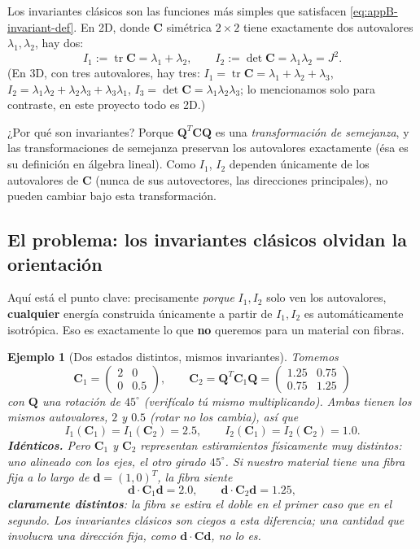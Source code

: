\documentclass[11pt,a4paper]{article}
\newtheorem{ejemplo}{Ejemplo}
\newcommand{\tr}{\operatorname{tr}}
\begin{document}
Los invariantes cl\'asicos son las funciones m\'as simples que
satisfacen \eqref{eq:appB-invariant-def}. En 2D, donde $\bm C$
sim\'etrica $2\times2$ tiene exactamente dos autovalores
$\lambda_1,\lambda_2$, hay dos:
\begin{equation}
 I_1:=\tr\bm C=\lambda_1+\lambda_2,\qquad
 I_2:=\det\bm C=\lambda_1\lambda_2=J^2.
 \label{eq:appB-classical-2d}
\end{equation}
(En 3D, con tres autovalores, hay tres:
$I_1=\tr\bm C=\lambda_1+\lambda_2+\lambda_3$,
$I_2=\lambda_1\lambda_2+\lambda_2\lambda_3+\lambda_3\lambda_1$,
$I_3=\det\bm C=\lambda_1\lambda_2\lambda_3$; lo mencionamos solo para
contraste, en este proyecto todo es 2D.)

¿Por qu\'e son invariantes? Porque $\bm Q^T\bm C\bm Q$ es una
\emph{transformaci\'on de semejanza}, y las transformaciones de
semejanza preservan los autovalores exactamente (\'esa es su
definici\'on en \'algebra lineal). Como $I_1$, $I_2$ dependen
\'unicamente de los autovalores de $\bm C$ (nunca de sus autovectores,
las direcciones principales), no pueden cambiar bajo esta
transformaci\'on.

\subsection{El problema: los invariantes cl\'asicos olvidan la orientaci\'on}

Aqu\'i est\'a el punto clave: precisamente \emph{porque} $I_1,I_2$ solo
ven los autovalores, \textbf{cualquier} energ\'ia construida
\'unicamente a partir de $I_1,I_2$ es autom\'aticamente isotr\'opica.
Eso es exactamente lo que \textbf{no} queremos para un material con
fibras.

\begin{ejemplo}[Dos estados distintos, mismos invariantes]
\label{ex:appB-invariants}
Tomemos
\[
 \bm C_1=\begin{pmatrix}2&0\\0&0.5\end{pmatrix},
 \qquad
 \bm C_2=\bm Q^T\bm C_1\bm Q
 =\begin{pmatrix}1.25&0.75\\0.75&1.25\end{pmatrix}
\]
con $\bm Q$ una rotaci\'on de $45^\circ$ (verif\'icalo t\'u mismo
multiplicando). Ambas tienen los mismos autovalores, $2$ y $0.5$
(rotar no los cambia), as\'i que
\[
 I_1(\bm C_1)=I_1(\bm C_2)=2.5,\qquad
 I_2(\bm C_1)=I_2(\bm C_2)=1.0.
\]
\textbf{Id\'enticos.} Pero $\bm C_1$ y $\bm C_2$ representan
estiramientos f\'isicamente muy distintos: uno alineado con los ejes,
el otro girado $45^\circ$. Si nuestro material tiene una fibra fija a
lo largo de $\bm d=(1,0)^T$, la fibra siente
\[
 \bm d\cdot\bm C_1\bm d=2.0,\qquad
 \bm d\cdot\bm C_2\bm d=1.25,
\]
\textbf{claramente distintos}: la fibra se estira el doble en el
primer caso que en el segundo. Los invariantes cl\'asicos son ciegos a
esta diferencia; una cantidad que involucra una direcci\'on fija,
como $\bm d\cdot\bm C\bm d$, no lo es.
\end{ejemplo}
\end{document}
